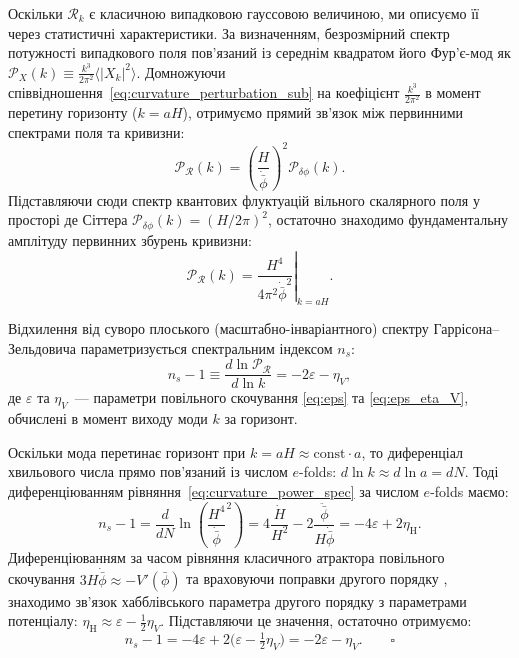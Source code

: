 Оскільки $\mathcal{R}_k$ є класичною випадковою гауссовою величиною, ми описуємо її через статистичні характеристики. За визначенням, безрозмірний спектр потужності випадкового поля пов'язаний із середнім квадратом його Фур'є-мод як $\mathcal{P}_X(k) \equiv \frac{k^3}{2\pi^2} \langle |X_k|^2 \rangle$. Домножуючи співвідношення~\eqref{eq:curvature_perturbation_sub} на коефіцієнт $\frac{k^3}{2\pi^2}$ в момент перетину горизонту ($k = aH$), отримуємо прямий зв'язок між первинними спектрами поля та кривизни:
\begin{equation}\label{eq:spec_relation}
  \mathcal{P}_{\mathcal{R}}(k) = \left(\frac{H}{\dot{\bar{\phi}}}\right)^{\!2} \mathcal{P}_{\delta\phi}(k).
\end{equation}
Підставляючи сюди спектр квантових флуктуацій вільного скалярного поля у просторі де Сіттера $\mathcal{P}_{\delta\phi}(k) = (H/2\pi)^2$, остаточно знаходимо фундаментальну амплітуду первинних збурень кривизни:
\begin{equation}\label{eq:curvature_power_spec}
  \mathcal{P}_{\mathcal{R}}(k) = \left. \frac{H^4}{4\pi^2\dot{\bar{\phi}}^2} \right|_{k=aH}.
\end{equation}

Відхилення від суворо плоського (масштабно-інваріантного) спектру Гаррісона--Зельдовича параметризується спектральним індексом $n_s$:
\begin{equation}\label{eq:ns}
  n_s - 1 \equiv \frac{d\ln\mathcal{P}_{\mathcal{R}}}{d\ln k} = -2\varepsilon - \eta_V,
\end{equation}
де $\varepsilon$ та $\eta_V$~--- параметри повільного скочування \eqref{eq:eps} та \eqref{eq:eps_eta_V}, обчислені в момент виходу моди $k$ за горизонт.

\begin{keybox}[title={Математичне виведення співвідношення для $n_s$}]
Оскільки мода перетинає горизонт при $k = aH \approx \mathrm{const} \cdot a$, то диференціал хвильового числа прямо пов'язаний із числом $e$-folds: $d\ln k \approx d\ln a = dN$. Тоді диференціюванням рівняння~\eqref{eq:curvature_power_spec} за числом $e$-folds маємо:
\begin{equation*}
  n_s - 1 = \frac{d}{dN}\ln\! \left(\frac{H^4}{\dot{\bar\phi}}^2\right) = 4\frac{\dot H}{H^2} - 2\frac{\ddot{\bar\phi}}{H\dot{\bar\phi}} = -4\varepsilon + 2\eta_\mathrm{H}.
\end{equation*}
Диференціюванням за часом рівняння класичного атрактора повільного скочування $3H\dot{\bar\phi} \approx -V'(\bar\phi)$ та враховуючи поправки другого порядку \cite{mukhanov_2005}, знаходимо зв'язок хабблівського параметра другого порядку з параметрами потенціалу: $\eta_\mathrm{H} \approx \varepsilon - \tfrac{1}{2}\eta_V$. Підставляючи це значення, остаточно отримуємо:
\begin{equation*}
  n_s - 1 = -4\varepsilon + 2\bigl(\varepsilon - \tfrac{1}{2}\eta_V\bigr) = -2\varepsilon - \eta_V. \qquad\square
\end{equation*}
\end{keybox}

